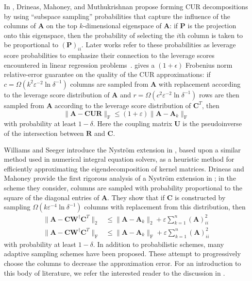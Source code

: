 \documentclass[11pt,letterpaper,twoside,reqno,nosumlimits]{amsart}
\def\pinv{\dagger}
\def\transp{T}
\newcommand{\mat}[1]{\ensuremath{\mathbf{#1}}}
\newcommand{\snorm}[1]{\ensuremath{\big\|#1\big\|_2}}
\newcommand{\fnorm}[1]{\ensuremath{\big\|#1\big\|_{\mathrm{F}}}}
\theoremstyle{remark}
\begin{document}
 In \cite{DMM08CUR}, Drineas, Mahoney, and Muthukrishnan propose forming CUR decompositions by using ``subspace sampling'' probabilities that capture the influence of the columns of $\mat{A}$ on the top $k$-dimensional eigenspace of $\mat{A}$: if $\mat{P}$ is the projection onto this eigenspace, then the probability of selecting the $i$th column is taken to be proportional to $(\mat{P})_{ii}.$ Later works refer to these probabilities as leverage score probabilities to emphasize their connection to the leverage scores encountered in linear regression problems~\cite{DM09,DM10}. \cite{DMM08CUR} gives a $(1+\epsilon)$ Frobenius norm relative-error guarantee on the quality of the CUR approximations: if $c = \Omega(k^2 \varepsilon^{-2} \ln \delta^{-1} )$ columns are sampled from $\mat{A}$ with replacement according to the leverage score distribution of $\mat{A}$ and $r = \Omega(c^2 \varepsilon^{-2} \ln \delta^{-1})$ rows are then sampled from $\mat{A}$ according to the leverage score distribution of $\mat{C}^\transp$, then
\[
 \fnorm{\mat{A} - \mat{C} \mat{U}\mat{R}} \leq (1 + \varepsilon) \fnorm{\mat{A} - \mat{A}_k}
\]
with probability at least $1-\delta.$ Here the coupling matrix $\mat{U}$ is the pseudoinverse of the intersection between $\mat{R}$ and $\mat{C}.$ 


Williams and Seeger introduce the Nystr\"om extension in \cite{SW01}, based upon a similar method used in numerical integral equation solvers, as a heuristic method for efficiently approximating the eigendecomposition of kernel matrices. %
Drineas and Mahoney provide the first rigorous analysis of a Nystr\"om extension in \cite{DM05}; in the scheme they consider, columns are sampled with probability proportional to the square of the diagonal entries of $\mat{A}$. They show that if $\mat{C}$ is constructed by sampling $\Omega(k \varepsilon^{-4} \ln\delta^{-1})$ columns with replacement from this distribution, then
\begin{align*}
\snorm{\mat{A} - \mat{C} \mat{W}^\pinv \mat{C}^\transp} & \leq \snorm{\mat{A} - \mat{A}_k} + \varepsilon \sum_{k=1}^n (\mat{A})_{ii}^2 \\
\fnorm{\mat{A} - \mat{C} \mat{W}^\pinv \mat{C}^\transp} & \leq \fnorm{\mat{A} - \mat{A}_k} + \varepsilon \sum_{k=1}^n (\mat{A})_{ii}^2
\end{align*}
with probability at least $1-\delta.$ In addition to probabilistic schemes, many adaptive sampling schemes have been proposed. These attempt to progressively choose the columns to decrease the approximation error. For an introduction to this body of literature, we refer the interested reader to the discussion in \cite{FGK11}.
\end{document}
